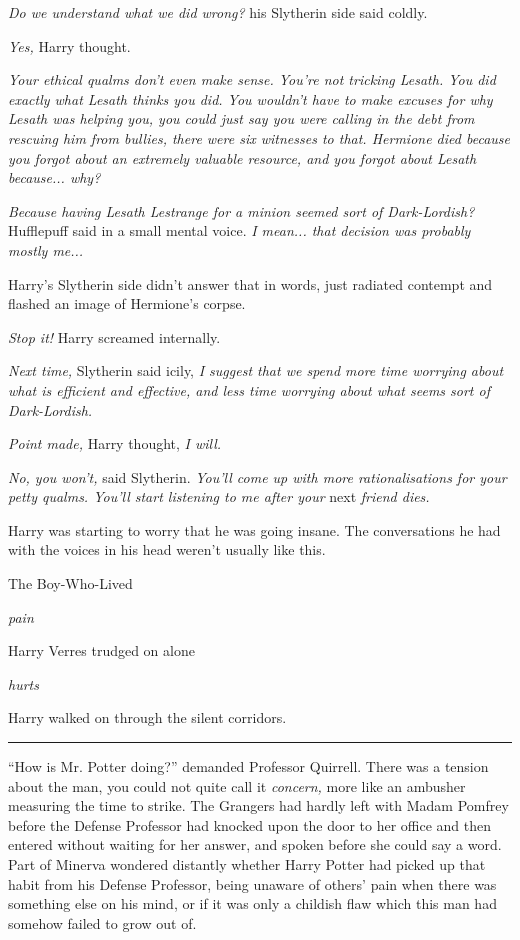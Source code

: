 \emph{Do we understand what we did wrong?} his Slytherin side said
coldly.

\emph{Yes,} Harry thought.

\emph{Your ethical qualms don't even make sense. You're not tricking
Lesath. You did exactly what Lesath thinks you did. You wouldn't have to
make excuses for why Lesath was helping you, you could just say you were
calling in the debt from rescuing him from bullies, there were six
witnesses to that. Hermione died because you forgot about an extremely
valuable resource, and you forgot about Lesath because... why?}

\emph{Because having Lesath Lestrange for a minion seemed sort of
Dark-Lordish?} Hufflepuff said in a small mental voice. \emph{I
mean... that decision was probably mostly me...}

Harry's Slytherin side didn't answer that in words, just radiated
contempt and flashed an image of Hermione's corpse.

\emph{Stop it!} Harry screamed internally.

\emph{Next time,} Slytherin said icily, \emph{I suggest that we spend
more time worrying about what is efficient and effective, and less time
worrying about what seems sort of Dark-Lordish.}

\emph{Point made,} Harry thought, \emph{I will.}

\emph{No, you won't,} said Slytherin. \emph{You'll come up with more
rationalisations for your petty qualms. You'll start listening to me
after your} next \emph{friend dies.}

Harry was starting to worry that he was going insane. The conversations
he had with the voices in his head weren't usually like this.

The Boy-Who-Lived

\emph{pain}

Harry Verres trudged on alone

\emph{hurts}

Harry walked on through the silent corridors.

\begin{center}\rule{3in}{0.4pt}\end{center}

``How is Mr. Potter doing?'' demanded Professor Quirrell. There was a
tension about the man, you could not quite call it \emph{concern,} more
like an ambusher measuring the time to strike. The Grangers had hardly
left with Madam Pomfrey before the Defense Professor had knocked upon
the door to her office and then entered without waiting for her answer,
and spoken before she could say a word. Part of Minerva wondered
distantly whether Harry Potter had picked up that habit from his Defense
Professor, being unaware of others' pain when there was something else
on his mind, or if it was only a childish flaw which this man had
somehow failed to grow out of.


